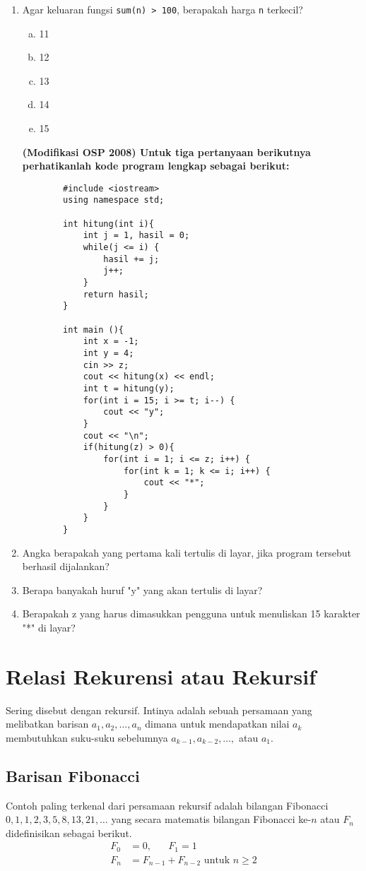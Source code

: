 \documentclass[11pt]{scrartcl}
\begin{document}
\begin{enumerate}
		\item Agar keluaran fungsi \verb*|sum(n) > 100|, 
		berapakah harga \verb*|n| terkecil?
			\begin{enumerate}[a)]
				\item 11
				\item 12
				\item 13
				\item 14
				\item 15
			\end{enumerate}
			
		\textbf{(Modifikasi OSP 2008) Untuk tiga pertanyaan berikutnya perhatikanlah kode program lengkap sebagai berikut:}
		\begin{lstlisting}
		#include <iostream>
		using namespace std;
		
		int hitung(int i){
			int j = 1, hasil = 0;
			while(j <= i) {
				hasil += j;
				j++;
			}
			return hasil;
		}
		
		int main (){
			int x = -1;
			int y = 4;
			cin >> z;
			cout << hitung(x) << endl;
			int t = hitung(y);
			for(int i = 15; i >= t; i--) {
				cout << "y";
			}	
			cout << "\n";
			if(hitung(z) > 0){
				for(int i = 1; i <= z; i++) {
					for(int k = 1; k <= i; i++) {
						cout << "*";
					}
				}
			}
		}
		\end{lstlisting}
		\item Angka berapakah yang pertama kali tertulis di 
		layar, jika program tersebut berhasil dijalankan?
		\item Berapa banyakah huruf "y" yang akan tertulis di 
		layar?
		\item Berapakah z yang harus dimasukkan pengguna 
		untuk menuliskan 15 karakter "*" di layar? 
	\end{enumerate}
	     
	\section{Relasi Rekurensi atau Rekursif}
		    Sering disebut dengan rekursif. Intinya adalah sebuah persamaan yang melibatkan barisan $a_1, a_2, \dots , a_n$ dimana untuk mendapatkan nilai $a_k$ membutuhkan suku-suku sebelumnya $a_{k-1}, a_{k-2}, \dots,$ atau $a_1$. 
		    
		    \subsection{Barisan Fibonacci}
		    Contoh paling terkenal dari persamaan rekursif adalah bilangan Fibonacci $0,1,1,2,3,5,8,13,21,\dots$ yang secara matematis bilangan Fibonacci ke-$n$ atau $F_n$ didefinisikan sebagai berikut.
		    \begin{align*}
		        F_0 &= 0, \hspace{20pt} F_1 = 1\\
		        F_n &= F_{n-1}+F_{n-2} \text{ untuk } n \ge 2
		    \end{align*}
		    
\end{document}
